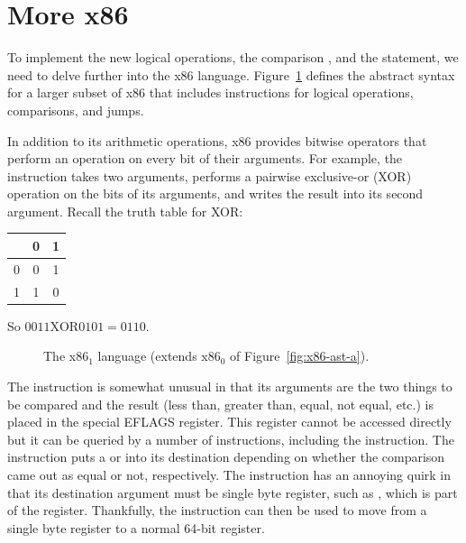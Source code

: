 \documentclass[11pt]{book}
\begin{document}
\section{More x86}
\label{sec:x86-1}

To implement the new logical operations, the comparison , and
the  statement, we need to delve further into the x86
language. Figure~\ref{fig:x86-ast-b} defines the abstract syntax for a
larger subset of x86 that includes instructions for logical
operations, comparisons, and jumps. 

In addition to its arithmetic operations, x86 provides bitwise
operators that perform an operation on every bit of their
arguments. For example, the  instruction takes two
arguments, performs a pairwise exclusive-or (XOR) operation on the
bits of its arguments, and writes the result into its second argument.
Recall the truth table for XOR: 
\begin{center}
\begin{tabular}{l|cc}
   & 0 & 1 \\ \hline
0  & 0 & 1 \\
1  & 1 & 0
\end{tabular}
\end{center}
So $0011 \mathrel{\mathrm{XOR}} 0101 = 0110$.

\begin{figure}[tbp]
\caption{The x86$_1$ language (extends x86$_0$ of Figure~\ref{fig:x86-ast-a}).}
\label{fig:x86-ast-b}
\end{figure}

The  instruction is somewhat unusual in that its arguments
are the two things to be compared and the result (less than, greater
than, equal, not equal, etc.) is placed in the special EFLAGS
register. This register cannot be accessed directly but it can be
queried by a number of instructions, including the 
instruction. The  instruction puts a  or  into
its destination depending on whether the comparison came out as equal
or not, respectively. The  instruction has an annoying quirk
in that its destination argument must be single byte register, such as
, which is part of the  register.  Thankfully, the
 instruction can then be used to move from a single byte
register to a normal 64-bit register.
\end{document}
